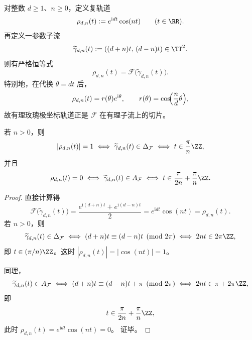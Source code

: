 \begin{corollary}[有理玫瑰轨道作为双相位平均门的对角与反对角切片]\label{cor:cdim-rhodonea-diagonal-antidiagonal-slice}
对整数 \(d\ge 1\)、\(n\ge 0\)，定义复轨道
\[
\rho_{d,n}(t):=e^{\mathrm{i}dt}\cos(nt)
\qquad (t\in\RR).
\]
再定义一参数子流
\[
\widetilde\gamma_{d,n}(t):=((d+n)t,\,(d-n)t)\in\TT^2.
\]
则有严格恒等式
\[
\rho_{d,n}(t)=\mathcal F\bigl(\widetilde\gamma_{d,n}(t)\bigr).
\]
特别地，在代换 \(\theta=dt\) 后，
\[
\rho_{d,n}(t)=r(\theta)e^{\mathrm{i}\theta},
\qquad
r(\theta)=\cos\!\Bigl(\frac{n}{d}\theta\Bigr),
\]
故有理玫瑰极坐标轨道正是 \(\mathcal F\) 在有理子流上的切片。

若 \(n>0\)，则
\[
|\rho_{d,n}(t)|=1
\iff
\widetilde\gamma_{d,n}(t)\in\Delta_{\mathcal F}
\iff
t\in \frac{\pi}{n}\ZZ,
\]
并且
\[
\rho_{d,n}(t)=0
\iff
\widetilde\gamma_{d,n}(t)\in A_{\mathcal F}
\iff
t\in \frac{\pi}{2n}+\frac{\pi}{n}\ZZ.
\]
\end{corollary}
\begin{proof}
直接计算得
\[
\mathcal F\bigl(\widetilde\gamma_{d,n}(t)\bigr)
=
\frac{e^{\mathrm{i}(d+n)t}+e^{\mathrm{i}(d-n)t}}{2}
=
e^{\mathrm{i}dt}\cos(nt)
=
\rho_{d,n}(t).
\]
若 \(n>0\)，则
\[
\widetilde\gamma_{d,n}(t)\in\Delta_{\mathcal F}
\iff
(d+n)t\equiv (d-n)t\pmod{2\pi}
\iff
2nt\in 2\pi\ZZ,
\]
即 \(t\in (\pi/n)\ZZ\)。这时 \(|\rho_{d,n}(t)|=|\cos(nt)|=1\)。

同理，
\[
\widetilde\gamma_{d,n}(t)\in A_{\mathcal F}
\iff
(d+n)t\equiv (d-n)t+\pi\pmod{2\pi}
\iff
2nt\in \pi+2\pi\ZZ,
\]
即
\[
t\in \frac{\pi}{2n}+\frac{\pi}{n}\ZZ,
\]
此时 \(\rho_{d,n}(t)=e^{\mathrm{i}dt}\cos(nt)=0\)。
证毕。
\end{proof}

